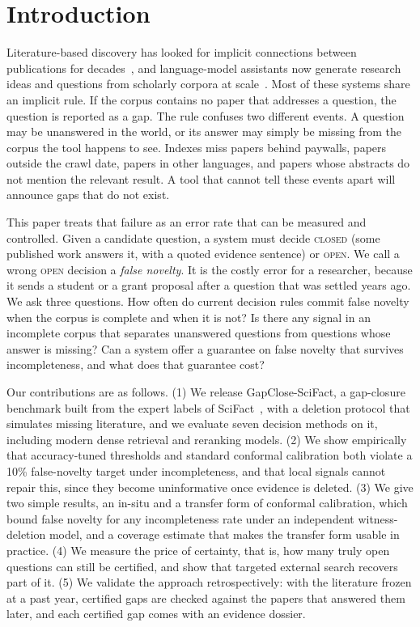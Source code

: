 \documentclass[conference,a4paper]{IEEEtran}
\theoremstyle{definition}
\newcommand{\open}{\textup{\textsc{open}}}
\newcommand{\closed}{\textup{\textsc{closed}}}
\begin{document}
\section{Introduction}
Literature-based discovery has looked for implicit connections between publications for decades~\cite{swanson1986}, and language-model assistants now generate research ideas and questions from scholarly corpora at scale~\cite{baek2025,wang2024scimon,si2025}. Most of these systems share an implicit rule. If the corpus contains no paper that addresses a question, the question is reported as a gap. The rule confuses two different events. A question may be unanswered in the world, or its answer may simply be missing from the corpus the tool happens to see. Indexes miss papers behind paywalls, papers outside the crawl date, papers in other languages, and papers whose abstracts do not mention the relevant result. A tool that cannot tell these events apart will announce gaps that do not exist.

This paper treats that failure as an error rate that can be measured and controlled. Given a candidate question, a system must decide \closed{} (some published work answers it, with a quoted evidence sentence) or \open{}. We call a wrong \open{} decision a \emph{false novelty}. It is the costly error for a researcher, because it sends a student or a grant proposal after a question that was settled years ago. We ask three questions. How often do current decision rules commit false novelty when the corpus is complete and when it is not? Is there any signal in an incomplete corpus that separates unanswered questions from questions whose answer is missing? Can a system offer a guarantee on false novelty that survives incompleteness, and what does that guarantee cost?

Our contributions are as follows.
(1) We release GapClose-SciFact, a gap-closure benchmark built from the expert labels of SciFact~\cite{wadden2020}, with a deletion protocol that simulates missing literature, and we evaluate seven decision methods on it, including modern dense retrieval and reranking models.
(2) We show empirically that accuracy-tuned thresholds and standard conformal calibration both violate a 10\% false-novelty target under incompleteness, and that local signals cannot repair this, since they become uninformative once evidence is deleted.
(3) We give two simple results, an in-situ and a transfer form of conformal calibration, which bound false novelty for any incompleteness rate under an independent witness-deletion model, and a coverage estimate that makes the transfer form usable in practice.
(4) We measure the price of certainty, that is, how many truly open questions can still be certified, and show that targeted external search recovers part of it.
(5) We validate the approach retrospectively: with the literature frozen at a past year, certified gaps are checked against the papers that answered them later, and each certified gap comes with an evidence dossier.
\end{document}
